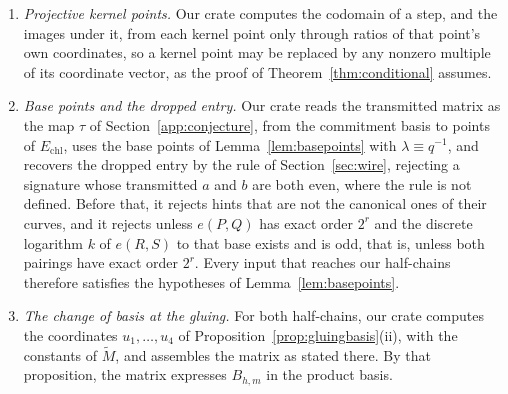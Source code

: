\documentclass[version=preprint]{iacrcc}
\newcommand{\Echl}{E_{\mathrm{chl}}}
\begin{document}
\begin{remark}[Conformance]
\begin{enumerate}[label=(\alph*)]
            and rejects every $m > 40$. So every input that reaches our
            half-chains has $a_1$ odd and $1 \le m \le 40$, as
            Lemma~\ref{lem:gluing} requires. Before Cornacchia's algorithm, our
            verifier repeats the goodness test of Section~\ref{sec:verif} and
            rejects a degree that is not good; being deterministic, it runs its 40
            Miller--Rabin rounds on the first 40 primes as bases. Our signer
            applies the same deterministic test and the same bound on $m$ to
            every candidate degree, so it never produces a signature that the
            verifier rejects for either reason. The properties above are all
            that this appendix uses.
            \item \emph{Projective kernel points.} Our crate computes the codomain
            of a step, and the images under it, from each kernel point only through
            ratios of that point's own coordinates, so a kernel point may be
            replaced by any nonzero multiple of its coordinate vector, as the proof
            of Theorem~\ref{thm:conditional} assumes.
            \item \emph{Base points and the dropped entry.} Our crate reads the
            transmitted matrix as the map $\tau$ of Section~\ref{app:conjecture},
            from the commitment basis to points of $\Echl$, uses the base points
            of Lemma~\ref{lem:basepoints} with $\lambda \equiv q^{-1}$, and
            recovers the dropped entry by the rule of Section~\ref{sec:wire},
            rejecting a signature whose transmitted $a$ and $b$ are both even,
            where the rule is not defined. Before that, it rejects hints that
            are not the canonical ones of their curves, and it rejects unless
            $e(P, Q)$ has exact order $2^r$ and the discrete logarithm $k$ of
            $e(R, S)$ to that base exists and is odd, that is, unless both
            pairings have exact order $2^r$. Every input that reaches our
            half-chains therefore satisfies the hypotheses of
            Lemma~\ref{lem:basepoints}.
            \item \emph{The change of basis at the gluing.} For both half-chains,
            our crate computes the coordinates $u_1, \ldots, u_4$ of
            Proposition~\ref{prop:gluingbasis}(ii), with the constants of $\tilde
            M$, and assembles the matrix as stated there. By that proposition,
            the matrix expresses $B_{h,m}$ in the product basis.
        \end{enumerate}

\end{remark}
\end{document}
